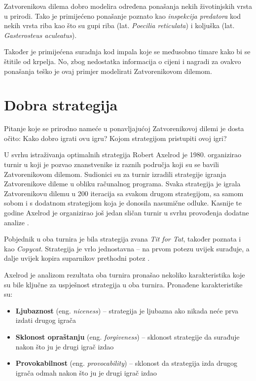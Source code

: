 \documentclass[zavrsnirad]{fer}
\begin{document}
	Zatvorenikova dilema dobro modelira određena ponašanja nekih životinjskih vrsta u prirodi. Tako je primijećeno ponašanje poznato kao \textit{inspekcija predatora} kod nekih vrsta riba kao što su gupi riba (lat. \textit{Poecilia reticulata}) i koljuška (lat. \textit{Gasterosteus aculeatus}). \cite{TheEvolutionOfCooperation}
	
	Također je primijećena suradnja kod impala koje se međusobno timare kako bi se štitile od krpelja. No, zbog nedostatka informacija o cijeni i nagradi za ovakvo ponašanja teško je ovaj primjer modelirati Zatvorenikovom dilemom. \cite{TheEvolutionOfCooperation}

	\section{Dobra strategija}
	\label{pog:DobraStrategija}
	
		Pitanje koje se prirodno nameće u ponavljajućoj Zatvorenikovoj dilemi je dosta očito: Kako dobro igrati ovu igru? Kojom strategijom pristupiti ovoj igri?

		U svrhu istraživanja optimalnih strategija Robert Axelrod je 1980. organizirao turnir \cite{1980Axelrod1} u koji je pozvao znanstvenike iz raznih područja koji su se bavili Zatvorenikovom dilemom. Sudionici su za turnir izradili strategije igranja Zatvorenikove dileme u obliku računalnog programa. Svaka strategija je igrala Zatvorenikovu dilemu u 200 iteracija sa svakom drugom strategijom, sa samom sobom i s dodatnom strategijom koja je donosila nasumične odluke. Kasnije te godine Axelrod je organizirao još jedan sličan turnir u svrhu provođenja dodatne analize \cite{1980Axelrod2}.
	
		Pobjednik u oba turnira je bila strategija zvana \textit{Tit for Tat}, također poznata i kao \textit{Copycat}. Strategija je vrlo jednostavna -- na prvom potezu uvijek surađuje, a dalje uvijek kopira suparnikov prethodni potez \cite{1980Axelrod1}.
	
		Axelrod je analizom rezultata oba turnira pronašao nekoliko karakteristika koje su bile ključne za uspješnost strategija u oba turnira. Pronađene karakteristike su:
		\begin{itemize}
			\item \textbf{Ljubaznost} (eng. \textit{niceness}) \cite{1980Axelrod1} -- strategija je ljubazna ako nikada neće prva izdati drugog igrača
			\item \textbf{Sklonost opraštanju} (eng. \textit{forgiveness}) \cite{1980Axelrod1} -- sklonost strategije da surađuje nakon što ju je drugi igrač izdao
			\item \textbf{Provokabilnost} (eng. \textit{provocability}) \cite{1980Axelrod2} -- sklonost da strategija izda drugog igrača odmah nakon što ju je drugi igrač izdao
		\end{itemize}
		
\end{document}
